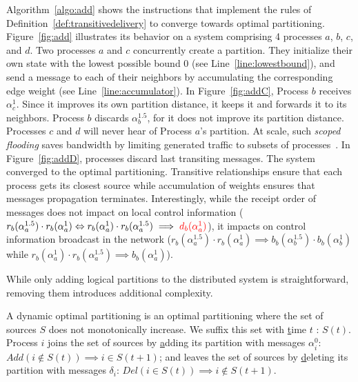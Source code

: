Algorithm~\ref{algo:add} shows the instructions that implement the
rules of Definition~\ref{def:transitivedelivery} to converge towards
optimal partitioning. Figure~\ref{fig:add} illustrates its behavior on
a system comprising 4 processes $a$, $b$, $c$, and $d$. Two processes
$a$ and $c$ concurrently create a partition. They initialize their own
state with the lowest possible bound $0$ (see
Line~\ref{line:lowestbound}), and send a message to each of their
neighbors by accumulating the corresponding edge weight (see
Line~\ref{line:accumulator}). In Figure~\ref{fig:addC}, Process $b$
receives $\alpha_{c}^{1}$. Since it improves its own partition
distance, it keeps it and forwards it to its neighbors. Process $b$
discards $\alpha_{b}^{1.5}$, for it does not improve its partition
distance. Processes $c$ and $d$ will never hear of Process $a$'s
partition. At scale, such \emph{scoped flooding} saves bandwidth by
limiting generated traffic to subsets of
processes~\cite{wang2015prodiluvian}. In Figure~\ref{fig:addD},
processes discard last transiting messages. The system converged to
the optimal partitioning.  Transitive relationships ensure that each
process gets its closest source while accumulation of weights ensures
that messages propagation terminates.  Interestingly, while the
receipt order of messages does not impact on local control information
($r_b(\alpha_a^{1.5}) \cdot r_b(\alpha_a^{1}) \Leftrightarrow
r_b(\alpha_a^{1}) \cdot r_b(\alpha_a^{1.5}) \implies
\textcolor{red}{d_b(\alpha_a^{1})}$), it impacts on control information
broadcast in the network ($r_b(\alpha_a^{1.5}) \cdot r_b(\alpha_a^{1})
\implies b_b(\alpha_{b}^{1.5}) \cdot b_b(\alpha_{b}^{1})$ while
$r_b(\alpha_a^{1}) \cdot r_b(\alpha_a^{1.5}) \implies
b_b(\alpha_a^{1})$).

While only adding logical partitions to the distributed system is
straightforward, removing them introduces additional complexity. 

\begin{definition}
  A dynamic optimal partitioning is an optimal partitioning where the
  set of sources $S$ does not monotonically increase. We suffix this
  set with \underline{t}ime $t$ : $S(t)$.  Process $i$ joins the set
  of sources by \underline{a}dding its partition with messages
  $\alpha_i^{0}$: $Add(i \not\in S(t)) \implies i \in S(t+1)$; and
  leaves the set of sources by \underline{d}eleting its partition with
  messages $\delta_i$: $Del(i \in S(t)) \implies i \not\in S(t+1)$.
\end{definition}

